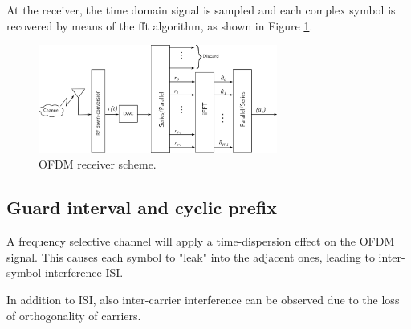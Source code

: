 At the receiver, the time domain signal is sampled and each complex symbol is recovered by means of the \gls{fft} algorithm, as shown in Figure \ref{fig:ofdm_receive}.

\begin{figure}[H]
	\centering
	\includegraphics[width=0.7\textwidth]{Images/theoretical/ofdm/ofdm_receive.png}
	\caption{OFDM receiver scheme.}
	\label{fig:ofdm_receive}
\end{figure}

\subsection{Guard interval and cyclic prefix}
A frequency selective channel will apply a time-dispersion effect on the OFDM signal. This causes each symbol to "leak" into the adjacent ones, leading to inter-symbol interference ISI.

In addition to ISI, also inter-carrier interference can be observed due to the loss of orthogonality of carriers.

